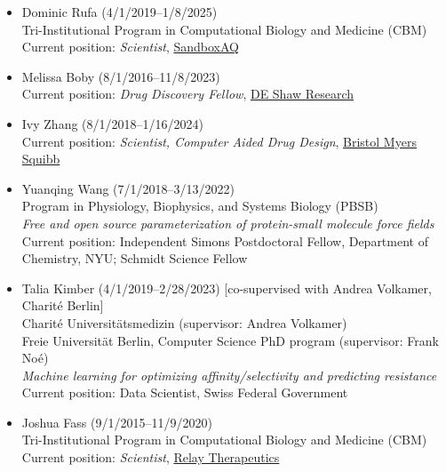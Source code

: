 \documentclass[10pt]{article}
\begin{document}
\begin{itemize}

  \item Dominic Rufa (4/1/2019--1/8/2025)\\
  Tri-Institutional Program in Computational Biology and Medicine (CBM)\\
  Current position: \emph{Scientist}, \href{https://www.sandboxaq.com/}{SandboxAQ}


  \item Melissa Boby (8/1/2016--11/8/2023)\\
  Current position: \emph{Drug Discovery Fellow}, \href{https://www.deshawresearch.com/}{DE Shaw Research}

  \item Ivy Zhang (8/1/2018--1/16/2024)\\
  Current position: \emph{Scientist, Computer Aided Drug Design}, \href{https://www.bms.com/}{Bristol Myers Squibb}
 
  \item Yuanqing Wang (7/1/2018--3/13/2022)\\
  Program in Physiology, Biophysics, and Systems Biology (PBSB)\\
  \emph{Free and open source parameterization of protein-small molecule force fields}\\
  Current position: Independent Simons Postdoctoral Fellow, Department of Chemistry, NYU; Schmidt Science Fellow

  \item Talia Kimber (4/1/2019--2/28/2023) [co-supervised with Andrea Volkamer, Charit\'e Berlin] \\
  Charit\'e Universit\"{a}tsmedizin (supervisor: Andrea Volkamer)\\
  Freie Universit\"{a}t Berlin, Computer Science PhD program (supervisor: Frank No\'{e})\\
  \emph{Machine learning for optimizing affinity/selectivity and predicting resistance}\\
  Current position: Data Scientist, Swiss Federal Government
  
  \item Joshua Fass (9/1/2015--11/9/2020)\\
  Tri-Institutional Program in Computational Biology and Medicine (CBM)\\
  Current position: \emph{Scientist}, \href{https://relaytx.com/}{Relay Therapeutics}
  

\end{itemize}
\end{document}
